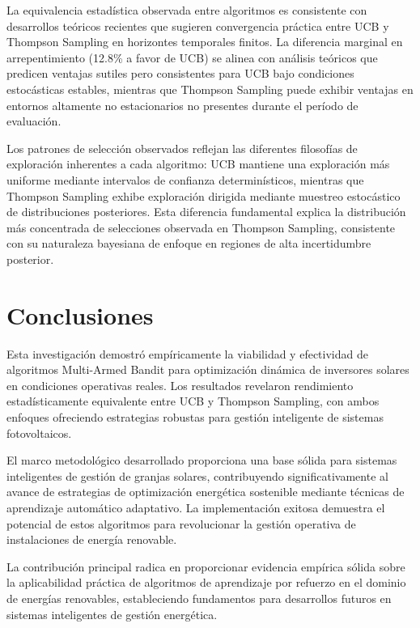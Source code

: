 \documentclass[conference]{IEEEtran}
\begin{document}
La equivalencia estadística observada entre algoritmos es consistente con desarrollos teóricos recientes que sugieren convergencia práctica entre UCB y Thompson Sampling en horizontes temporales finitos. La diferencia marginal en arrepentimiento (12.8\% a favor de UCB) se alinea con análisis teóricos que predicen ventajas sutiles pero consistentes para UCB bajo condiciones estocásticas estables, mientras que Thompson Sampling puede exhibir ventajas en entornos altamente no estacionarios no presentes durante el período de evaluación.

Los patrones de selección observados reflejan las diferentes filosofías de exploración inherentes a cada algoritmo: UCB mantiene una exploración más uniforme mediante intervalos de confianza determinísticos, mientras que Thompson Sampling exhibe exploración dirigida mediante muestreo estocástico de distribuciones posteriores. Esta diferencia fundamental explica la distribución más concentrada de selecciones observada en Thompson Sampling, consistente con su naturaleza bayesiana de enfoque en regiones de alta incertidumbre posterior.

\section{Conclusiones}

Esta investigación demostró empíricamente la viabilidad y efectividad de algoritmos Multi-Armed Bandit para optimización dinámica de inversores solares en condiciones operativas reales. Los resultados revelaron rendimiento estadísticamente equivalente entre UCB y Thompson Sampling, con ambos enfoques ofreciendo estrategias robustas para gestión inteligente de sistemas fotovoltaicos.

El marco metodológico desarrollado proporciona una base sólida para sistemas inteligentes de gestión de granjas solares, contribuyendo significativamente al avance de estrategias de optimización energética sostenible mediante técnicas de aprendizaje automático adaptativo. La implementación exitosa demuestra el potencial de estos algoritmos para revolucionar la gestión operativa de instalaciones de energía renovable.

La contribución principal radica en proporcionar evidencia empírica sólida sobre la aplicabilidad práctica de algoritmos de aprendizaje por refuerzo en el dominio de energías renovables, estableciendo fundamentos para desarrollos futuros en sistemas inteligentes de gestión energética.
\end{document}
